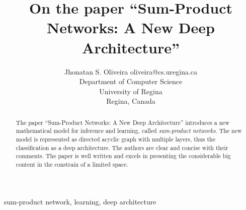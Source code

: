 \documentclass[twoside,11pt]{article}
\newcommand{\thistitle}{{On the paper ``Sum-Product Networks: A New Deep Architecture''}}
\begin{document}
\title{\thistitle}

\author{\name Jhonatan S. Oliveira \email oliveira@cs.uregina.ca \\
\addr Department of Computer Science \\
University of Regina \\ 
Regina, Canada
}


\maketitle

\begin{abstract}%
The paper ``Sum-Product Networks: A New Deep Architecture'' introduces a new mathematical model for inference and learning, called \emph{sum-product networks}.
The new model is represented as directed acyclic graph with multiple layers, thus the classification as a deep architecture.
The authors are clear and concise with their comments.
The paper is well written and excels in presenting the considerable big content in the constrain of a limited space.
\end{abstract}

\begin{keywords}
sum-product network, learning, deep architecture
\end{keywords}






\vskip 0.2in

\end{document}
